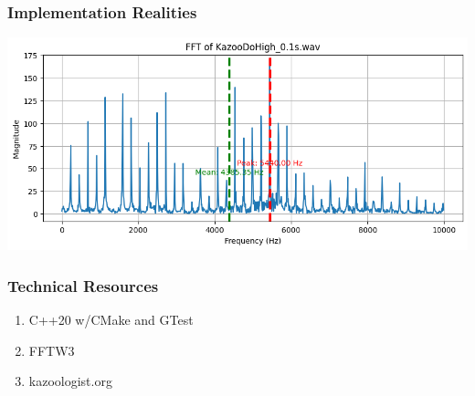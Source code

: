 \documentclass[
	11pt, %
]{beamer}
\begin{document}
\begin{frame}
  \frametitle{Implementation Realities}

  \begin{center}
    \includegraphics[width=1\linewidth]{fft_1.png}
  \end{center}


\end{frame}


\begin{frame}
  \frametitle{Technical Resources}
  \begin{enumerate}
    \item C++20 w/CMake and GTest
    \item FFTW3
    \item kazoologist.org
  \end{enumerate}
\end{frame}

\end{document}
